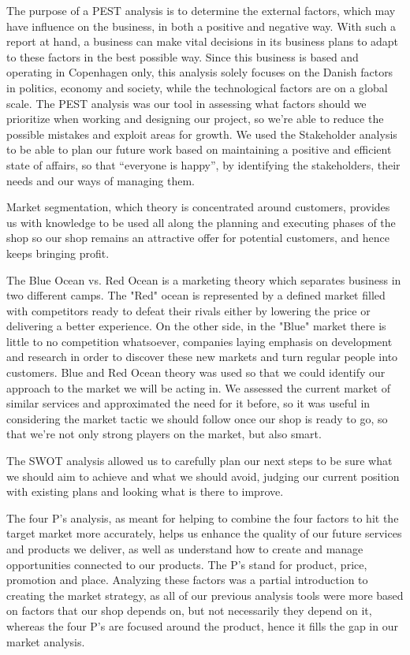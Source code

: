 \documentclass[12p]{article}
\begin{document}
The purpose of a PEST analysis is to determine the external factors, which may have influence on the business, in both a positive and negative way. With such a report at hand, a business can make vital decisions in its business plans to adapt to these factors in the best possible way. Since this business is based and operating in Copenhagen only, this analysis solely focuses on the Danish factors in politics, economy and society, while the technological factors are on a global scale. The PEST analysis was our tool in assessing what factors should we prioritize when working and designing our project, so we’re able to reduce the possible mistakes and exploit areas for growth.
We used the Stakeholder analysis to be able to plan our future work based on maintaining a positive and efficient state of affairs, so that “everyone is happy”, by identifying the stakeholders, their needs and our ways of managing them. 

Market segmentation, which theory is concentrated around customers, provides us with knowledge to be used all along the planning and executing phases of the shop so our shop remains an attractive offer for potential customers, and hence keeps bringing profit. 

The Blue Ocean vs. Red Ocean is a marketing theory which separates business in two different camps. The "Red" ocean is represented by a defined market filled with competitors ready to defeat their rivals either by lowering the price or delivering a better experience. On the other side, in the "Blue" market there is little to no competition whatsoever, companies laying emphasis on development and research in order to discover these new markets and turn regular people into customers. Blue and Red Ocean theory was used so that we could identify our approach to the market we will be acting in. We assessed the current market of similar services and approximated the need for it before, so it was useful in considering the market tactic we should follow once our shop is ready to go, so that we’re not only strong players on the market, but also smart.

The SWOT analysis allowed us to carefully plan our next steps to be sure what we should aim to achieve and what we should avoid, judging our current position with existing plans and looking what is there to improve. 

The four P’s analysis, as meant for helping to combine the four factors to hit the target market more accurately, helps us enhance the quality of our future services and products we deliver, as well as understand how to create and manage opportunities connected to our products. The P’s stand for product, price, promotion and place. Analyzing these factors was a partial introduction to creating the market strategy, as all of our previous analysis tools were more based on factors that our shop depends on, but not necessarily they depend on it, whereas the four P’s are focused around the product, hence it fills the gap in our market analysis.
\end{document}
